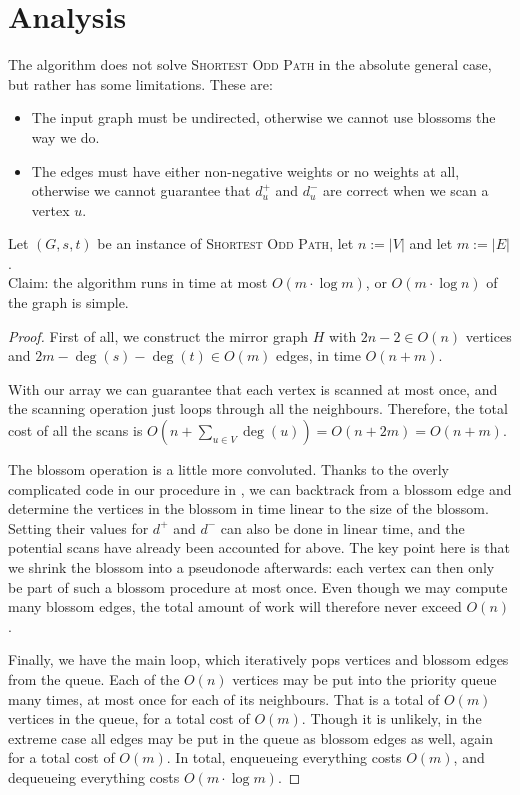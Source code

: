 \section{Analysis}
The algorithm does not solve \textsc{Shortest Odd Path} in the absolute general case, but rather has some limitations. These are: 
\begin{itemize}
    \item The input graph must be undirected, otherwise we cannot use blossoms the way we do.
    \item The edges must have either non-negative weights or no weights at all, otherwise we cannot guarantee that $d^+_u$ and $d^-_u$ are correct when we scan a vertex $u$.
\end{itemize}

\begin{theorem}
    Let $(G,s,t)$ be an instance of \textsc{Shortest Odd Path}, let $n := |V|$ and let $m := |E|$. \\
    Claim: the algorithm runs in time at most $O(m \cdot \log m)$, or $O(m \cdot \log n)$ of the graph is simple.
    \begin{proof}  
        First of all, we construct the mirror graph $H$ with $2n-2 \in O(n)$ vertices and $2m - \deg(s) - \deg(t) \in O(m)$ edges, in time $O(n+m)$.
        
        With our  array we can guarantee that each vertex is scanned at most once, and the scanning operation just loops through all the neighbours. Therefore, the total cost of all the scans is $O(n + \sum_{u \in V} \deg(u)) = O(n + 2m) = O(n + m)$.
    
        The blossom operation is a little more convoluted. Thanks to the overly complicated code in our  procedure in , we can backtrack from a blossom edge and determine the vertices in the blossom in time linear to the size of the blossom. Setting their values for $d^+$ and $d^-$ can also be done in linear time, and the potential scans have already been accounted for above. The key point here is that we shrink the blossom into a pseudonode afterwards: each vertex can then only be part of such a blossom procedure at most once. Even though we may compute many blossom edges, the total amount of work will therefore never exceed $O(n)$.
    
        Finally, we have the main loop, which iteratively pops vertices and blossom edges from the queue. Each of the $O(n)$ vertices may be put into the priority queue many times, at most once for each of its neighbours. That is a total of $O(m)$ vertices in the queue, for a total cost of $O(m)$. Though it is unlikely, in the extreme case all edges may be put in the queue as blossom edges as well, again for a total cost of $O(m)$. In total, enqueueing everything costs $O(m)$, and dequeueing everything costs $O(m \cdot \log m)$.
    

\end{proof}
\end{theorem}
